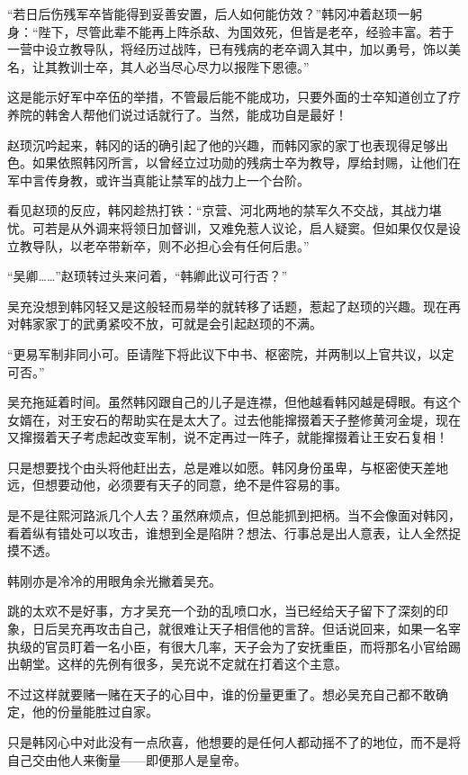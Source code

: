 “若日后伤残军卒皆能得到妥善安置，后人如何能仿效？”韩冈冲着赵顼一躬身：“陛下，尽管此辈不能再上阵杀敌、为国效死，但皆是老卒，经验丰富。若于一营中设立教导队，将经历过战阵，已有残病的老卒调入其中，加以勇号，饰以美名，让其教训士卒，其人必当尽心尽力以报陛下恩德。”

这是能示好军中卒伍的举措，不管最后能不能成功，只要外面的士卒知道创立了疗养院的韩舍人帮他们说过话就行了。当然，能成功自是最好！

赵顼沉吟起来，韩冈的话的确引起了他的兴趣，而韩冈家的家丁也表现得足够出色。如果依照韩冈所言，以曾经立过功勋的残病士卒为教导，厚给封赐，让他们在军中言传身教，或许当真能让禁军的战力上一个台阶。

看见赵顼的反应，韩冈趁热打铁：“京营、河北两地的禁军久不交战，其战力堪忧。可若是从外调来将领日加督训，又难免惹人议论，启人疑窦。但如果仅仅是设立教导队，以老卒带新卒，则不必担心会有任何后患。”

“吴卿……”赵顼转过头来问着，“韩卿此议可行否？”

吴充没想到韩冈轻又是这般轻而易举的就转移了话题，惹起了赵顼的兴趣。现在再对韩家家丁的武勇紧咬不放，可就是会引起赵顼的不满。

“更易军制非同小可。臣请陛下将此议下中书、枢密院，并两制以上官共议，以定可否。”

吴充拖延着时间。虽然韩冈跟自己的儿子是连襟，但他越看韩冈越是碍眼。有这个女婿在，对王安石的帮助实在是太大了。过去他能撺掇着天子整修黄河金堤，现在又撺掇着天子考虑起改变军制，说不定再过一阵子，就能撺掇着让王安石复相！

只是想要找个由头将他赶出去，总是难以如愿。韩冈身份虽卑，与枢密使天差地远，但想要动他，必须要有天子的同意，绝不是件容易的事。

是不是往熙河路派几个人去？虽然麻烦点，但总能抓到把柄。当不会像面对韩冈，看着纵有错处可以攻击，谁想到全是陷阱？想法、行事总是出人意表，让人全然捉摸不透。

韩刚亦是冷冷的用眼角余光撇着吴充。

跳的太欢不是好事，方才吴充一个劲的乱喷口水，当已经给天子留下了深刻的印象，日后吴充再攻击自己，就很难让天子相信他的言辞。但话说回来，如果一名宰执级的官员盯着一名小臣，有很大几率，天子会为了安抚重臣，而将那名小官给踢出朝堂。这样的先例有很多，吴充说不定就在打着这个主意。

不过这样就要赌一赌在天子的心目中，谁的份量更重了。想必吴充自己都不敢确定，他的份量能胜过自家。

只是韩冈心中对此没有一点欣喜，他想要的是任何人都动摇不了的地位，而不是将自己交由他人来衡量——即便那人是皇帝。


